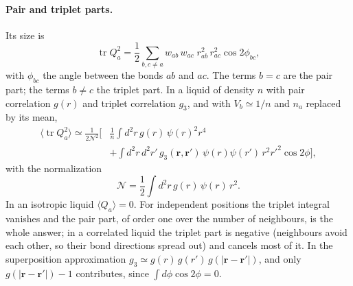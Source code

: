 \documentclass[11pt,aps,preprint,nofootinbib,superscriptaddress,tightenlines]{revtex4-2}
\def\st{\begin{equation}}
\def\stp{\end{equation}}
\def\tr{\operatorname{tr}}
\let\oldparagraph\paragraph
\renewcommand{\paragraph}{\par\bigskip\oldparagraph}
\begin{document}
\paragraph{Pair and triplet parts.}  Its size is
\st
\tr Q_a^2=\frac12\sum_{b,c\neq a}w_{ab}\,w_{ac}\;r_{ab}^2\,r_{ac}^2\cos2\phi_{bc} ,
\stp
with $\phi_{bc}$ the angle between the bonds $ab$ and $ac$.  The terms $b=c$ are the pair part; the terms $b\neq c$ the triplet part.  In a liquid of
density $n$ with pair correlation $g(r)$ and triplet correlation $g_3$, and with $V_b\simeq1/n$ and $n_a$ replaced by its mean,
\st
\begin{aligned}
\big\langle\tr Q_a^2\big\rangle\simeq\frac1{2\mathcal N^2}\Big[&\frac1n\int d^2r\,g(r)\,\psi(r)^2r^4\\
&+\int d^2r\,d^2r'\,g_3(\bm r,\bm r')\,\psi(r)\psi(r')\,r^2r'^2\cos2\phi\Big],
\end{aligned}
\label{Q2}
\stp
with the normalization
\st
\mathcal N=\frac12\int d^2r\,g(r)\,\psi(r)\,r^2 .
\stp
In an isotropic liquid $\langle Q_a\rangle=0$.  For independent positions the triplet integral vanishes and the pair part, of order one over the
number of neighbours, is the whole answer; in a correlated liquid the triplet part is negative (neighbours avoid each other, so their bond
directions spread out) and cancels most of it.  In the superposition approximation $g_3\simeq g(r)\,g(r')\,g(|\bm r-\bm r'|)$, and only
$g(|\bm r-\bm r'|)-1$ contributes, since $\int d\phi\cos2\phi=0$.
\end{document}
